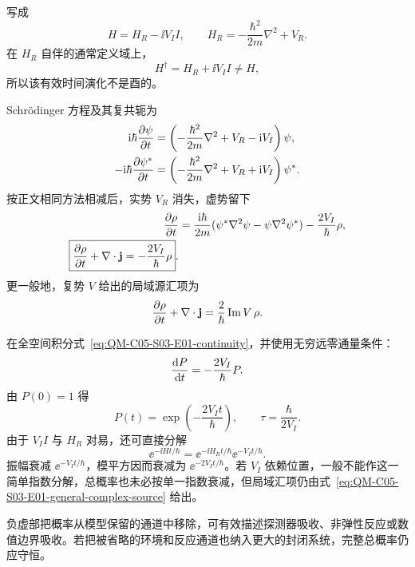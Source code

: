 \begin{checkedsolution}
写成
\begin{equation}
  H=H_R-\ii V_I I,
  \qquad
  H_R=-\frac{\hbar^2}{2m}\nabla^2+V_R.
  \label{eq:QM-C05-S03-E01-hamiltonian}
\end{equation}
在 $H_R$ 自伴的通常定义域上，
\begin{equation}
  H^\dagger=H_R+\ii V_I I\neq H,
  \label{eq:QM-C05-S03-E01-not-hermitian}
\end{equation}
所以该有效时间演化不是酉的。

Schr\"odinger 方程及其复共轭为
\begin{align}
  \mathrm{i}\hbar\frac{\partial \psi}{\partial t}
  &=\left(-\frac{\hbar^2}{2m}\nabla^2+V_R-\mathrm{i} V_I\right)\psi,
  \label{eq:QM-C05-S03-E01-schrodinger}\\
  -\mathrm{i}\hbar\frac{\partial \psi^*}{\partial t}
  &=\left(-\frac{\hbar^2}{2m}\nabla^2+V_R+\mathrm{i} V_I\right)\psi^*.
  \label{eq:QM-C05-S03-E01-conjugate}
\end{align}
按正文相同方法相减后，实势 $V_R$ 消失，虚势留下
\begin{align}
  \frac{\partial \rho}{\partial t}
  &=\frac{\mathrm{i}\hbar}{2m}
  (\psi^*\nabla^2\psi-\psi\nabla^2\psi^*)
  -\frac{2V_I}{\hbar}\rho,\\
  \boxed{
  \frac{\partial \rho}{\partial t}+\nabla\cdot\mathbf j
  =-\frac{2V_I}{\hbar}\rho}.
  \label{eq:QM-C05-S03-E01-continuity}
\end{align}
更一般地，复势 $V$ 给出的局域源汇项为
\begin{equation}
  \frac{\partial \rho}{\partial t}+\nabla\cdot\mathbf j
  =\frac{2}{\hbar}\operatorname{Im}V\,\rho.
  \label{eq:QM-C05-S03-E01-general-complex-source}
\end{equation}

在全空间积分式~\eqref{eq:QM-C05-S03-E01-continuity}，并使用无穷远零通量条件：
\begin{equation}
  \frac{\mathop{}\!\mathrm{d} P}{\mathop{}\!\mathrm{d} t}=-\frac{2V_I}{\hbar}P.
  \label{eq:QM-C05-S03-E01-total-ode}
\end{equation}
由 $P(0)=1$ 得
\begin{equation}
  \boxed{P(t)=\exp\left(-\frac{2V_It}{\hbar}\right)},
  \qquad
  \tau=\frac{\hbar}{2V_I}.
  \label{eq:QM-C05-S03-E01-total-probability}
\end{equation}
由于 $V_I I$ 与 $H_R$ 对易，还可直接分解
\begin{equation}
  \ee^{-\ii Ht/\hbar}
  =\ee^{-\ii H_Rt/\hbar}\ee^{-V_It/\hbar}.
  \label{eq:QM-C05-S03-E01-factorized-evolution}
\end{equation}
振幅衰减 $\ee^{-V_It/\hbar}$，模平方因而衰减为 $\ee^{-2V_It/\hbar}$。若 $V_I$ 依赖位置，一般不能作这一简单指数分解，总概率也未必按单一指数衰减，但局域汇项仍由式~\eqref{eq:QM-C05-S03-E01-general-complex-source} 给出。

负虚部把概率从模型保留的通道中移除，可有效描述探测器吸收、非弹性反应或数值边界吸收。若把被省略的环境和反应通道也纳入更大的封闭系统，完整总概率仍应守恒。
\end{checkedsolution}


